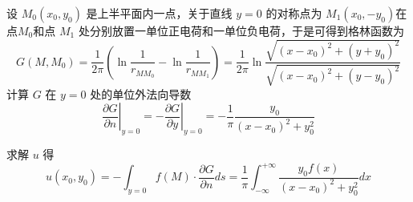 \begin{questions}
\begin{solution}
设 $ M_{0}\left(x_{0}, y_{0}\right) $ 是上半平面内一点，关于直线 $ y=0 $ 的对称点为 $ M_{1}\left(x_{0},-y_{0}\right) $在点$M_0$和点 $ M_1 $ 处分别放置一单位正电荷和一单位负电荷，于是可得到格林函数为 
$$ G\left(M, M_{0}\right)=\frac{1}{2 \pi}\left(\ln\frac{1}{r_{M M_{0}}}-\ln\frac{1}{r_{M M_{1}}}\right)=\frac{1}{2 \pi} \ln \frac{\sqrt{\left(x-x_{0}\right)^{2}+\left(y+y_{0}\right)^{2}}}{\sqrt{\left(x-x_{0}\right)^{2}+\left(y-y_{0}\right)^{2}}}  $$
计算 $ G $ 在 $ y=0 $ 处的单位外法向导数 
$$ \left.\frac{\partial G}{\partial n}\right|_{y=0}=-\left.\frac{\partial G}{\partial y}\right|_{y=0}=-\frac{1}{\pi} \frac{y_{0}}{\left(x-x_{0}\right)^{2}+y_{0}^{2}} $$

求解 $ u $ 得 $$ u\left(x_{0}, y_{0}\right)=-\int_{y=0} f(M) \cdot \frac{\partial G}{\partial n} d s=\frac{1}{\pi} \int_{-\infty}^{+\infty} \frac{y_{0} f(x)}{\left(x-x_{0}\right)^{2}+y_{0}^{2}} d x $$
\end{solution}



\end{questions}